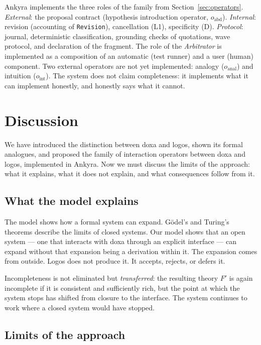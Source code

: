 \documentclass[12pt,a4paper]{article}
\begin{document}
Ankyra implements the three roles of the family from
Section~\ref{sec:operators}. \emph{External}: the proposal contract
(hypothesis introduction operator, $o_{\text{abd}}$). \emph{Internal}:
revision (accounting of \texttt{Revision}), cancellation (L1), specificity
(D). \emph{Protocol}: journal, deterministic classification, grounding checks
of quotations, wave protocol, and declaration of the fragment. The role of the
\emph{Arbitrator} is implemented as a composition of an automatic (test
runner) and a user (human) component. Two external operators are not yet
implemented: analogy ($o_{\text{anal}}$) and intuition ($o_{\text{int}}$). The
system does not claim completeness: it implements what it can implement
honestly, and honestly says what it cannot.

\section{Discussion}
\label{sec:discussion}

We have introduced the distinction between doxa and logos, shown its formal
analogues, and proposed the family of interaction operators between doxa and
logos, implemented in Ankyra. Now we must discuss the limits of the approach:
what it explains, what it does not explain, and what consequences follow from
it.

\subsection{What the model explains}
\label{sec:explains}

The model shows how a formal system can expand. G\"odel's and Turing's
theorems describe the limits of closed systems. Our model shows that an open
system --- one that interacts with doxa through an explicit interface --- can
expand without that expansion being a derivation within it. The expansion
comes from outside. Logos does not produce it. It accepts, rejects, or defers
it.

Incompleteness is not eliminated but \emph{transferred}: the resulting theory
$F'$ is again incomplete if it is consistent and sufficiently rich, but the
point at which the system stops has shifted from closure to the interface. The
system continues to work where a closed system would have stopped.

\subsection{Limits of the approach}
\label{sec:limits_approach}
\end{document}

